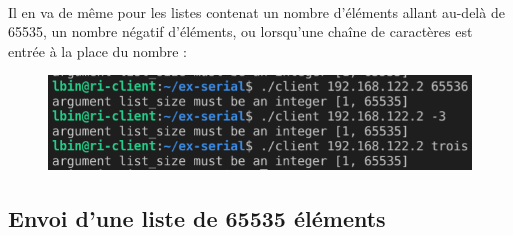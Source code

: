 \documentclass{article}
\begin{document}
    \paragraph{}
    Il en va de même pour les listes contenat un nombre d'éléments allant au-delà de 65535, un nombre négatif d'éléments, ou lorsqu'une chaîne de caractères est entrée à la place du nombre :
    \begin{figure}[H]
        \centering
        \includegraphics[width=.45\linewidth]{./screenshots/client-test-valeurs-hors-limite.png}
    \end{figure}

    \subsection{Envoi d'une liste de 65535 éléments}
\end{document}
